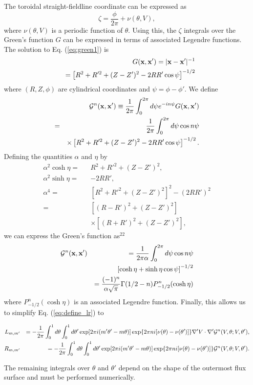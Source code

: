 \documentclass[prb,twocolumn,showpacs,preprintnumbers,amsmath,amssymb]{revtex4}
\renewcommand*{\v}[1]{\hbox{\bfseries #1}}
\begin{document}
The toroidal straight-fieldline coordinate can be expressed as
\[
\zeta = \frac{\phi}{2\pi} + \nu(\theta,V),
\]
where $\nu(\theta,V)$ is a periodic function of $\theta$.  Using this,
the $\zeta$ integrals over the Green's function $G$ can be expressed in
terms of associated Legendre functions.  The solution to
Eq. (\ref{eq:green1}) is
\begin{eqnarray}
&&G(\v{x},\v{x}') = |\v{x}-\v{x}'|^{-1} \nonumber \\
&&= \left[ R^2 + R'^2 + (Z - Z')^2 - 2 R R' \cos \psi \right]^{-1/2}
\end{eqnarray}
where $(R,Z,\phi)$ are cylindrical coordinates and $ \psi = \phi - \phi'
$.  We define
\begin{eqnarray}
&&{\cal G}^n(\v{x},\v{x}') 
\equiv \frac{1}{2 \pi} \int_0^{2 \pi} d\psi 
	e^{-in\psi} G(\v{x},\v{x}') \nonumber \\
=&& \frac{1}{2 \pi} \int_0^{2 \pi} d\psi \cos n\psi \nonumber \\
&&\times \left[ R^2 + R'^2 + (Z - Z')^2 - 2 R R' \cos \psi \right]^{-1/2}.
\end{eqnarray}
Defining the quantities $\alpha$ and $\eta$ by
\begin{eqnarray}
\alpha^2 \cosh \eta =&& R^2 + R'^2 + (Z - Z')^2, \nonumber \\
\alpha^2 \sinh \eta =&& - 2 R R', \nonumber \\
\alpha^4 =&& \left[ R^2 + R'^2 + (Z - Z')^2 \right]^2 
	- \left( 2 R R' \right)^2 \nonumber \\
=&& \left[ (R - R')^2 + (Z - Z')^2 \right] \nonumber \\
&& \times \left[ (R + R')^2 + (Z - Z')^2 \right],
\end{eqnarray}
we can express the Green's function as$^{22}$
\begin{eqnarray}
 {\cal G}^n(\v{x},\v{x}') 
&&= \frac{1}{2 \pi \alpha} \int_0^{2 \pi} d\psi \cos n \psi \nonumber \\
&&\left[ \cosh \eta + \sinh \eta \cos \psi \right]^{-1/2} \nonumber \\
&&= \frac{(-1)^n}{\alpha \sqrt \pi} \Gamma(1/2 - n) P_{-1/2}^n(\cosh \eta)
	\nonumber \\
\end{eqnarray}
where $P_{-1/2}^n(\cosh \eta)$ is an associated Legendre function.
Finally, this allows us to simplify Eq. (\ref{eq:define_lr}) to
\begin{widetext}
\begin{eqnarray}
L_{m,m'} &&= - \frac{1}{2 \pi} \int_0^1 d\theta \int_0^1 d\theta'
	\exp [ 2 \pi i (m' \theta' - m \theta)]
	\exp \{ 2 \pi n i [\nu(\theta)- \nu(\theta')]\}
	\nabla' V \cdot \nabla' 
	{\cal G}^n (V,\theta;V,\theta'), \nonumber \\
R_{m,m'} &&= - \frac{1}{2 \pi} \int_0^1 d\theta \int_0^1 d\theta'
	\exp [ 2 \pi i (m' \theta' - m \theta)]
	\exp \{ 2 \pi n i [\nu(\theta)- \nu(\theta')]\}
	{\cal G}^n (V,\theta;V,\theta'). \nonumber
\end{eqnarray}
\end{widetext}
The remaining integrals over $\theta$ and $\theta'$ depend on the shape
of the outermost flux surface and must be performed numerically.
\end{document}
